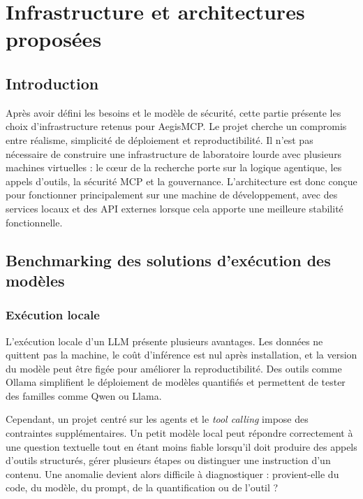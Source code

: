\chapter{Infrastructure et architectures proposées}

\section*{Introduction}

Après avoir défini les besoins et le modèle de sécurité, cette partie présente les choix d'infrastructure retenus pour AegisMCP. Le projet cherche un compromis entre réalisme, simplicité de déploiement et reproductibilité. Il n'est pas nécessaire de construire une infrastructure de laboratoire lourde avec plusieurs machines virtuelles : le cœur de la recherche porte sur la logique agentique, les appels d'outils, la sécurité MCP et la gouvernance. L'architecture est donc conçue pour fonctionner principalement sur une machine de développement, avec des services locaux et des API externes lorsque cela apporte une meilleure stabilité fonctionnelle.

\section{Benchmarking des solutions d'exécution des modèles}

\subsection{Exécution locale}

L'exécution locale d'un LLM présente plusieurs avantages. Les données ne quittent pas la machine, le coût d'inférence est nul après installation, et la version du modèle peut être figée pour améliorer la reproductibilité. Des outils comme Ollama simplifient le déploiement de modèles quantifiés et permettent de tester des familles comme Qwen ou Llama.

Cependant, un projet centré sur les agents et le \textit{tool calling} impose des contraintes supplémentaires. Un petit modèle local peut répondre correctement à une question textuelle tout en étant moins fiable lorsqu'il doit produire des appels d'outils structurés, gérer plusieurs étapes ou distinguer une instruction d'un contenu. Une anomalie devient alors difficile à diagnostiquer : provient-elle du code, du modèle, du prompt, de la quantification ou de l'outil ?

